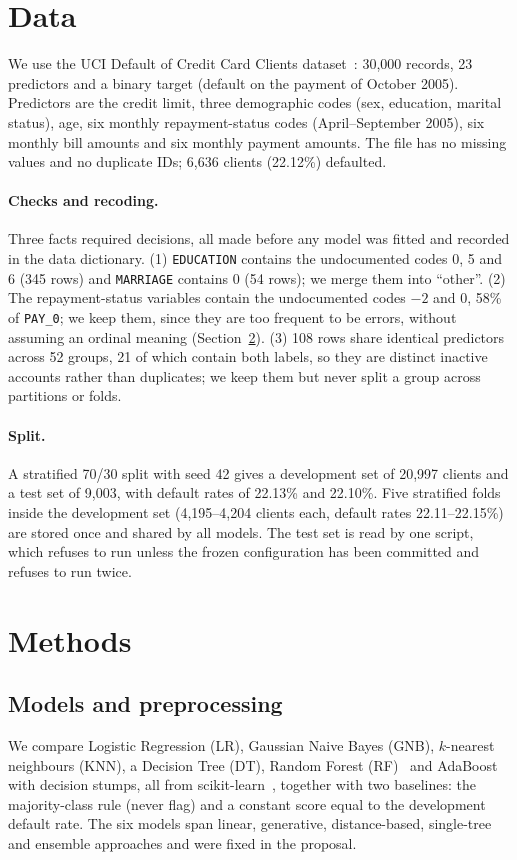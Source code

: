 \documentclass{article}
\begin{document}
\section{Data}
\label{sec:data}
We use the UCI Default of Credit Card Clients dataset~\citep{uci_default}: 30{,}000 records, 23 predictors and a binary target (default on the payment of October 2005). Predictors are the credit limit, three demographic codes (sex, education, marital status), age, six monthly repayment-status codes (April--September 2005), six monthly bill amounts and six monthly payment amounts. The file has no missing values and no duplicate IDs; 6{,}636 clients (22.12\%) defaulted.

\paragraph{Checks and recoding.} Three facts required decisions, all made before any model was fitted and recorded in the data dictionary. (1) \texttt{EDUCATION} contains the undocumented codes 0, 5 and 6 (345 rows) and \texttt{MARRIAGE} contains 0 (54 rows); we merge them into ``other''. (2) The repayment-status variables contain the undocumented codes $-2$ and 0, 58\% of \texttt{PAY\_0}; we keep them, since they are too frequent to be errors, without assuming an ordinal meaning (Section~\ref{sec:methods}). (3) 108 rows share identical predictors across 52 groups, 21 of which contain both labels, so they are distinct inactive accounts rather than duplicates; we keep them but never split a group across partitions or folds.

\paragraph{Split.} A stratified 70/30 split with seed 42 gives a development set of 20{,}997 clients and a test set of 9{,}003, with default rates of 22.13\% and 22.10\%. Five stratified folds inside the development set (4{,}195--4{,}204 clients each, default rates 22.11--22.15\%) are stored once and shared by all models. The test set is read by one script, which refuses to run unless the frozen configuration has been committed and refuses to run twice.

\section{Methods}
\label{sec:methods}
\subsection{Models and preprocessing}
We compare Logistic Regression (LR), Gaussian Naive Bayes (GNB), $k$-nearest neighbours (KNN), a Decision Tree (DT), Random Forest (RF)~\citep{breiman2001random} and AdaBoost~\citep{freund1997decision} with decision stumps, all from scikit-learn~\citep{pedregosa2011scikit}, together with two baselines: the majority-class rule (never flag) and a constant score equal to the development default rate. The six models span linear, generative, distance-based, single-tree and ensemble approaches and were fixed in the proposal.
\end{document}

